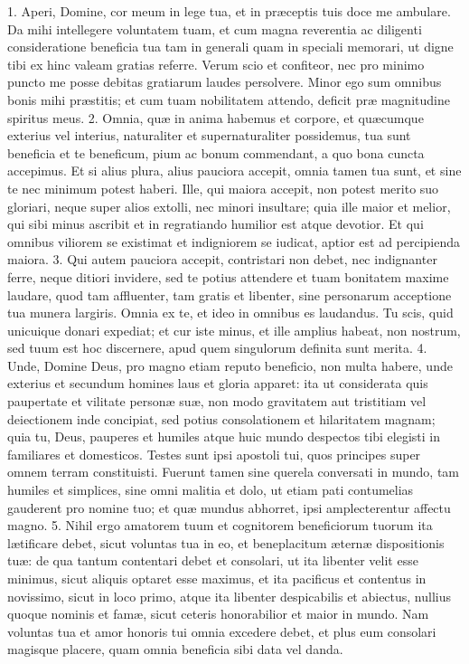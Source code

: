 1. Aperi, Domine, cor meum in lege tua, et in præceptis tuis doce me ambulare. Da mihi intellegere voluntatem tuam, et cum magna reverentia ac diligenti consideratione beneficia tua tam in generali quam in speciali memorari, ut digne tibi ex hinc valeam gratias referre. Verum scio et confiteor, nec pro minimo puncto me posse debitas gratiarum laudes persolvere. Minor ego sum omnibus bonis mihi præstitis; et cum tuam nobilitatem attendo, deficit præ magnitudine spiritus meus.
2. Omnia, quæ in anima habemus et corpore, et quæcumque exterius vel interius, naturaliter et supernaturaliter possidemus, tua sunt beneficia et te beneficum, pium ac bonum commendant, a quo bona cuncta accepimus. Et si alius plura, alius pauciora accepit, omnia tamen tua sunt, et sine te nec minimum potest haberi. Ille, qui maiora accepit, non potest merito suo gloriari, neque super alios extolli, nec minori insultare; quia ille maior et melior, qui sibi minus ascribit et in regratiando humilior est atque devotior. Et qui omnibus viliorem se existimat et indigniorem se iudicat, aptior est ad percipienda maiora.
3. Qui autem pauciora accepit, contristari non debet, nec indignanter ferre, neque ditiori invidere, sed te potius attendere et tuam bonitatem maxime laudare, quod tam affluenter, tam gratis et libenter, sine personarum acceptione tua munera largiris. Omnia ex te, et ideo in omnibus es laudandus. Tu scis, quid unicuique donari expediat; et cur iste minus, et ille amplius habeat, non nostrum, sed tuum est hoc discernere, apud quem singulorum definita sunt merita.
4. Unde, Domine Deus, pro magno etiam reputo beneficio, non multa habere, unde exterius et secundum homines laus et gloria apparet: ita ut considerata quis paupertate et vilitate personæ suæ, non modo gravitatem aut tristitiam vel deiectionem inde concipiat, sed potius consolationem et hilaritatem magnam; quia tu, Deus, pauperes et humiles atque huic mundo despectos tibi elegisti in familiares et domesticos. Testes sunt ipsi apostoli tui, quos principes super omnem terram constituisti. Fuerunt tamen sine querela conversati in mundo, tam humiles et simplices, sine omni malitia et dolo, ut etiam pati contumelias gauderent pro nomine tuo; et quæ mundus abhorret, ipsi amplecterentur affectu magno.
5. Nihil ergo amatorem tuum et cognitorem beneficiorum tuorum ita lætificare debet, sicut voluntas tua in eo, et beneplacitum æternæ dispositionis tuæ: de qua tantum contentari debet et consolari, ut ita libenter velit esse minimus, sicut aliquis optaret esse maximus, et ita pacificus et contentus in novissimo, sicut in loco primo, atque ita libenter despicabilis et abiectus, nullius quoque nominis et famæ, sicut ceteris honorabilior et maior in mundo. Nam voluntas tua et amor honoris tui omnia excedere debet, et plus eum consolari magisque placere, quam omnia beneficia sibi data vel danda.


